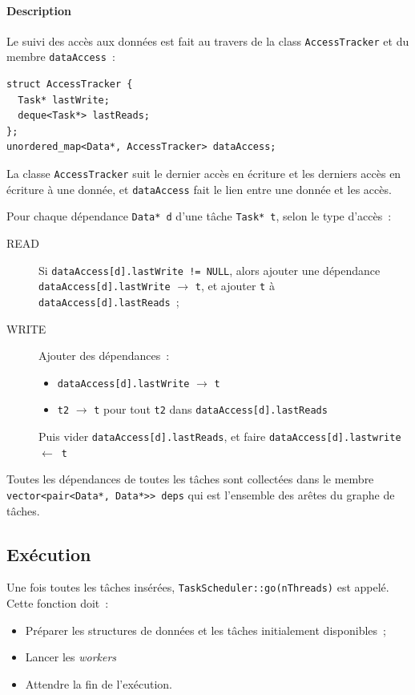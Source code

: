 \documentclass[11pt]{article}
\theoremstyle{plain} %
\theoremstyle{definition} %
\begin{document}
\paragraph{Description}
\label{sec:description}
Le suivi des accès aux données est fait au travers de la class \texttt{AccessTracker} et du membre \texttt{dataAccess}~:
\begin{lstlisting}
struct AccessTracker {
  Task* lastWrite;
  deque<Task*> lastReads;
};
unordered_map<Data*, AccessTracker> dataAccess;
\end{lstlisting}
La classe \texttt{AccessTracker} suit le dernier accès en écriture et les derniers accès en écriture à une donnée, et \texttt{dataAccess} fait le lien entre une donnée et les accès.

Pour chaque dépendance \texttt{Data* d} d'une tâche \texttt{Task* t}, selon le type d'accès~:
\begin{description}
\item[READ] Si \texttt{dataAccess[d].lastWrite != NULL}, alors ajouter une dépendance \texttt{dataAccess[d].lastWrite} $\to$ \texttt{t}, et ajouter \texttt{t} à \texttt{dataAccess[d].lastReads}~;
\item[WRITE] Ajouter des dépendances~:
  \begin{itemize}
  \item \texttt{dataAccess[d].lastWrite} $\to$ \texttt{t}
  \item \texttt{t2} $\to$ \texttt{t} pour tout \texttt{t2} dans \texttt{dataAccess[d].lastReads}
  \end{itemize}
  Puis vider \texttt{dataAccess[d].lastReads}, et faire \texttt{dataAccess[d].lastwrite}~$\gets$~\texttt{t}
\end{description}

Toutes les dépendances de toutes les tâches sont collectées dans le membre \texttt{vector<pair<Data*, Data*>{}> deps} qui est l'ensemble des arêtes du graphe de tâches.

\subsection{Exécution}
\label{sec:execution}
Une fois toutes les tâches insérées, \texttt{TaskScheduler::go(nThreads)} est appelé.
Cette fonction doit~:
\begin{itemize}
\item Préparer les structures de données et les tâches initialement disponibles~;
\item Lancer les \emph{workers}
\item Attendre la fin de l'exécution.
\end{itemize}
\end{document}
